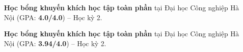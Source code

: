 \begin{cvempty} %
  \begin{cvitems} %
    \item {\textbf{Học bổng khuyến khích học tập toàn phần} tại Đại học Công nghiệp Hà Nội (GPA: \textbf{4.0/4.0}) -- Học kỳ 2.\hfill{}}
    \item {\textbf{Học bổng khuyến khích học tập toàn phần} tại Đại học Công nghiệp Hà Nội (GPA: \textbf{3.94/4.0}) -- Học kỳ 2.\hfill{}}
  \end{cvitems}

\end{cvempty}
